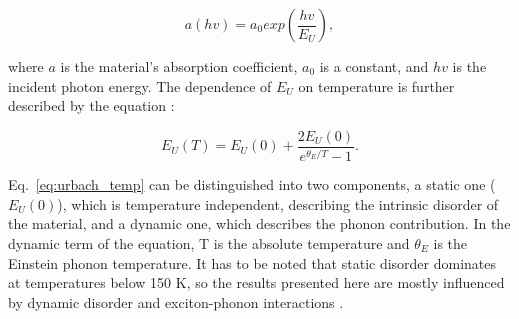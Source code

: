 \begin{equation}
    a(hv) = a_0exp(\frac{hv}{E_U}),
    \label{eq:urbach_absorption}
\end{equation}

where $a$ is the material's absorption coefficient, $a_0$ is a constant, and $hv$ is the incident photon energy. The dependence of $E_U$ on temperature is further described by the equation \cite{Kurik1971UrbachRule}: 

\begin{equation}
    E_U(T) = E_U(0) + \frac{2E_U(0)}{e^{\theta_E /T}-1}.
    \label{eq:urbach_temp}
\end{equation}

Eq.~\ref{eq:urbach_temp} can be distinguished into two components, a static one ($E_U(0)$), which is temperature independent, describing the intrinsic disorder of the material, and a dynamic one, which describes the phonon contribution. In the dynamic term of the equation, T is the absolute temperature and $\theta_E$ is the Einstein phonon temperature. It has to be noted that static disorder dominates at temperatures below 150 K, so the results presented here are mostly influenced by dynamic disorder and exciton-phonon interactions \cite{Zhang2022UnravelingDisorder}.


